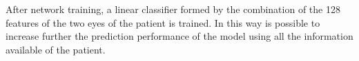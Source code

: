\documentclass[review]{elsarticle}
\theoremstyle{definition} %
\theoremstyle{remark}
\begin{document}
After network training, a linear classifier formed by the combination of the 128 features of the two eyes of the patient is trained. In this way is possible to increase further the prediction performance of the model using all the information available of the patient.

\begin{figure}[ht!]
	\centering
\end{figure}
\end{document}
